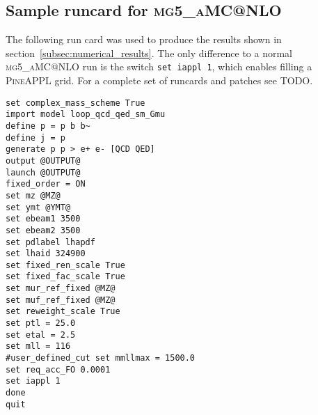 \subsection{Sample runcard for \texorpdfstring{\textsc{mg5\_aMC@NLO}}{mg5\_aMC@NLO}}
\label{app:sample-runcard}

The following run card was used to produce the results shown in section~\ref{subsec:numerical_results}.
The only difference to a normal \textsc{mg5\_aMC@NLO} run is the switch \texttt{set iappl 1}, which enables filling a \textsc{PineAPPL} grid.
For a complete set of runcards and patches see TODO.


\begin{lstlisting}
set complex_mass_scheme True
import model loop_qcd_qed_sm_Gmu
define p = p b b~
define j = p
generate p p > e+ e- [QCD QED]
output @OUTPUT@
launch @OUTPUT@
fixed_order = ON
set mz @MZ@
set ymt @YMT@
set ebeam1 3500
set ebeam2 3500
set pdlabel lhapdf
set lhaid 324900
set fixed_ren_scale True
set fixed_fac_scale True
set mur_ref_fixed @MZ@
set muf_ref_fixed @MZ@
set reweight_scale True
set ptl = 25.0
set etal = 2.5
set mll = 116
#user_defined_cut set mmllmax = 1500.0
set req_acc_FO 0.0001
set iappl 1
done
quit
\end{lstlisting}
